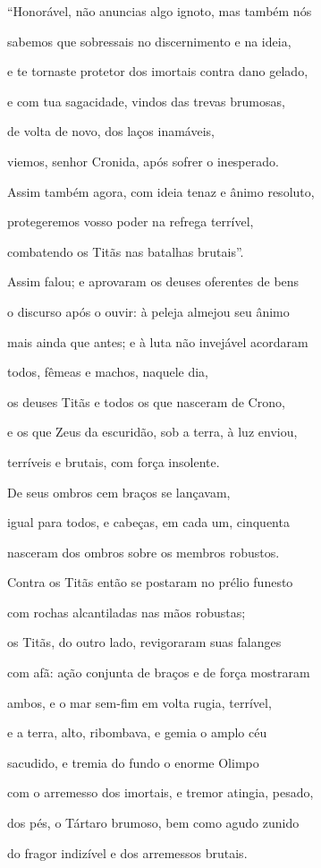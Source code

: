 \begin{pages}
\begin{Rightside}
``Honorável, não anuncias algo ignoto, mas também nós 

sabemos que sobressais no discernimento e na ideia,

e te tornaste protetor dos imortais contra dano gelado,

e com tua sagacidade, vindos das trevas brumosas,

de volta de novo, dos laços inamáveis,

viemos, senhor Cronida, após sofrer o inesperado. 

Assim também agora, com ideia tenaz e ânimo resoluto,

protegeremos vosso poder na refrega terrível,

combatendo os Titãs nas batalhas brutais''.

Assim falou; e aprovaram os deuses oferentes de bens

o discurso após o ouvir: à peleja almejou seu ânimo 

mais ainda que antes; e à luta não invejável acordaram

todos, fêmeas e machos, naquele dia,

os deuses Titãs e todos os que nasceram de Crono,

e os que Zeus da escuridão, sob a terra, à luz enviou,

terríveis e brutais, com força insolente. 

De seus ombros cem braços se lançavam,

igual para todos, e cabeças, em cada um, cinquenta

nasceram dos ombros sobre os membros robustos.

Contra os Titãs então se postaram no prélio funesto

com rochas alcantiladas nas mãos robustas; 

os Titãs, do outro lado, revigoraram suas falanges

com afã: ação conjunta de braços e de força mostraram

ambos, e o mar sem-fim em volta rugia, terrível,

e a terra, alto, ribombava, e gemia o amplo céu

sacudido, e tremia do fundo o enorme Olimpo 

com o arremesso dos imortais, e tremor atingia, pesado,

dos pés, o Tártaro brumoso, bem como agudo zunido

do fragor indizível e dos arremessos brutais.


\end{Rightside}
\end{pages}
